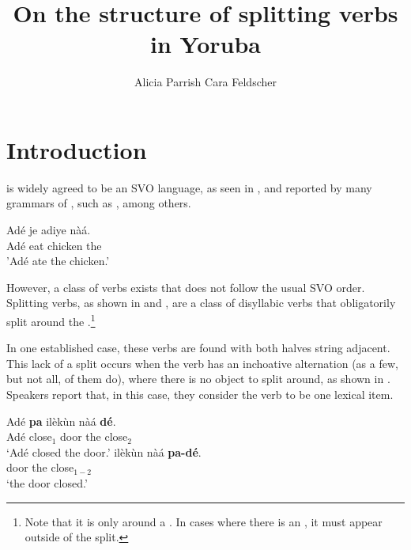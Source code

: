 \documentclass[output=paper]{LSP/langsci}
\author{Alicia Parrish\affiliation{Michigan State University} 
\lastand Cara Feldscher\affiliation{Michigan State University} 
}
\title{On the structure of splitting verbs in {Y}oruba}
\begin{document}
\section{Introduction}
 is widely agreed to be an SVO language, as seen in , and reported by many grammars of , such as \citet{Bamgbose1966}, among others. 

\ea
    \gll Ad\'{e} je adiye n\`{a}\'{a}. \\
    Ad\'{e} eat chicken the \\
    \glt 'Ad\'{e} ate the chicken.'
    \label{ex:parrish:SVO}
\z

However, a class of verbs exists that does not follow the usual SVO order. Splitting verbs, as shown in  and , are a class of disyllabic verbs that obligatorily split around the .\footnote{Note that it is only around a . In cases where there is an , it must appear outside of the split.}


\ea
    \label{ex:parrish:must-embed}
	\label{ex:parrish:bad-no-embed}
	\z
\z

In one established case, these verbs are found with both halves string adjacent. This lack of a split occurs when the verb has an inchoative alternation (as a few, but not all, of them do), where there is no object to split around, as shown in . Speakers report that, in this case, they consider the verb to be one lexical item.


\ea 
 \ea 
	\gll Ad\'{e} \textbf{pa} il\`{e}k\`{u}n n\`{a}\'{a} \textbf{d\'{e}}. \\
	Ad\'{e} {close$_{1}$} door the {close$_{2}$} \\
	\glt `Ad\'{e} closed the door.'
 \ex 
	\gll il\`{e}k\`{u}n n\`{a}\'{a} \textbf{pa-d\'{e}}. \\
	door the {close$_{1-2}$} \\
	\glt `the door closed.'
\label{ex:parrish:inchoative}
 \z 
\z 
\end{document}
